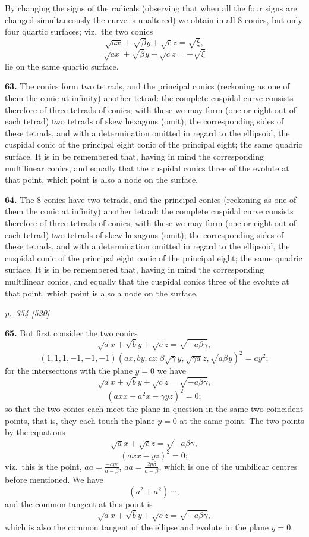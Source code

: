 \documentclass[11pt,a4paper]{book}
\begin{document}
By changing the signs of the radicals (observing that when all the four signs are changed simultaneously the curve is unaltered) we obtain in all 8 conics, but only four quartic surfaces; viz.\ the two conics
\[
\sqrt{a x} + \sqrt{\beta}y + \sqrt{c}z = \sqrt{\xi},
\]
\[
\sqrt{a x} + \sqrt{\beta}y + \sqrt{c}z = -\sqrt{\xi}
\]
lie on the same quartic surface.

\textbf{63.} The conics form two tetrads, and the principal conics (reckoning as one of them the conic at infinity) another tetrad: the complete cuspidal curve consists therefore of three tetrads of conics; with these we may form (one or eight out of each tetrad) two tetrads of skew hexagons (omit\.); the corresponding sides of these tetrads, and with a determination omitted in regard to the ellipsoid, the cuspidal conic of the principal eight conic of the principal eight; the same quadric surface. It is in be remembered that, having in mind the corresponding multilinear conics, and equally that the cuspidal conics three of the evolute at that point, which point is also a node on the surface.

\textbf{64.} The 8 conics have two tetrads, and the principal conics (reckoning as one of them the conic at infinity) another tetrad: the complete cuspidal curve consists therefore of three tetrads of conics; with these we may form (one or eight out of each tetrad) two tetrads of skew hexagons (omit\.); the corresponding sides of these tetrads, and with a determination omitted in regard to the ellipsoid, the cuspidal conic of the principal eight conic of the principal eight; the same quadric surface. It is in be remembered that, having in mind the corresponding multilinear conics, and equally that the cuspidal conics three of the evolute at that point, which point is also a node on the surface.

\clearpage

\bigskip
\textit{p.~354 [520]}
\smallskip

\textbf{65.} But first consider the two conics
\[
\sqrt{a}x + \sqrt{b}y + \sqrt{c}z = \sqrt{-a\beta\gamma},
\]
\[
(1, 1, 1, -1, -1, -1)(a x, b y, c z; \beta\sqrt{\gamma}y, \sqrt{\gamma a}z, \sqrt{a\beta}y)^2 = a y^2;
\]
for the intersections with the plane $y = 0$ we have
\[
\sqrt{a}x + \sqrt{b}y + \sqrt{c}z = \sqrt{-a\beta\gamma},
\]
\[
(a x x - a^2 x - \gamma y z)^2 = 0;
\]
so that the two conics each meet the plane in question in the same two coincident points, that is, they each touch the plane $y = 0$ at the same point. The two points by the equations
\[
\sqrt{a}x + \sqrt{c}z = \sqrt{-a\beta\gamma},
\]
\[
(a x x - y z)^2 = 0;
\]
viz.\ this is the point, $a a = \tfrac{-a y c}{a - \beta}$, $a a = \tfrac{2y\beta}{a - \beta}$, which is one of the umbilicar centres before mentioned. We have
\[
(a^2 + a^2)\,\cdots,
\]
and the common tangent at this point is
\[
\sqrt{a}x + \sqrt{b}y + \sqrt{c}z = \sqrt{-a\beta\gamma},
\]
which is also the common tangent of the ellipse and evolute in the plane $y = 0$.
\end{document}
